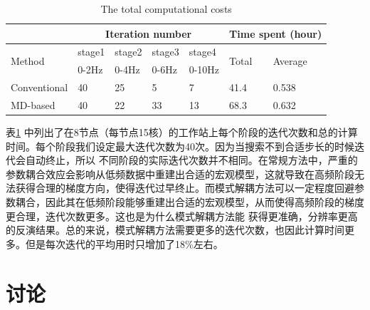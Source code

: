 \begin{table}
    \caption{The total computational costs}
    \label{table:TotalComputime}
    \begin{tabular}{p{1.8cm}p{1.0cm}p{1.0cm}p{1.0cm}p{1.2cm}p{1.0cm}p{1.0cm}}
    \hline
    \quad&\multicolumn{4}{c}{Iteration number}&\multicolumn{2}{c}{Time spent (hour)} \\
    \hline
    \multirow{2}{*}{Method} & stage1 &stage2 &stage3 &stage4 &\multirow{2}{*}{Total}
    &\multirow{2}{*}{Average} \\
    & 0-2Hz &0-4Hz&0-6Hz&0-10Hz\\
    \hline
    Conventional&  40   &25&5& 7  &41.4&0.538\\
    MD-based &   40  & 22 &33 &13&68.3&0.632\\
    \hline
    \end{tabular}
\end{table}

表\ref{table:TotalComputime}
中列出了在8节点（每节点15核）的工作站上每个阶段的迭代次数和总的计算时间。每个阶段我们设定最大迭代次数为40次。因为当搜索不到合适步长的时候迭代会自动终止，所以
不同阶段的实际迭代次数并不相同。在常规方法中，严重的参数耦合效应会影响从低频数据中重建出合适的宏观模型，这就导致在高频阶段无法获得合理的梯度方向，使得迭代过早终止。而模式解耦方法可以一定程度回避参数耦合，因此其在低频阶段能够重建出合适的宏观模型，从而使得高频阶段的梯度更合理，迭代次数更多。这也是为什么模式解耦方法能
获得更准确，分辨率更高的反演结果。总的来说，模式解耦方法需要更多的迭代次数，也因此计算时间更多。但是每次迭代的平均用时只增加了18\%左右。
\section{讨论}
